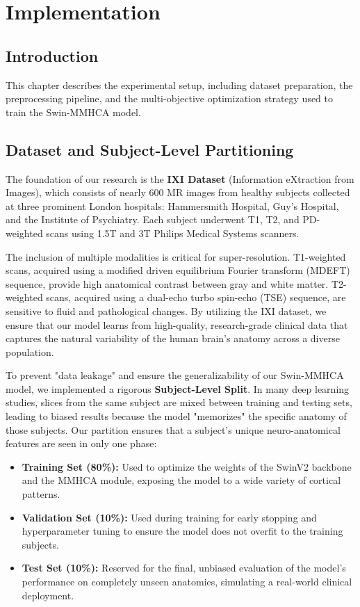 \chapter{Implementation}

\section{Introduction}
This chapter describes the experimental setup, including dataset preparation, the preprocessing pipeline, and the multi-objective optimization strategy used to train the Swin-MMHCA model.

\section{Dataset and Subject-Level Partitioning}
The foundation of our research is the \textbf{IXI Dataset} (Information eXtraction from Images), which consists of nearly 600 MR images from healthy subjects collected at three prominent London hospitals: Hammersmith Hospital, Guy's Hospital, and the Institute of Psychiatry. Each subject underwent T1, T2, and PD-weighted scans using 1.5T and 3T Philips Medical Systems scanners.

The inclusion of multiple modalities is critical for super-resolution. T1-weighted scans, acquired using a modified driven equilibrium Fourier transform (MDEFT) sequence, provide high anatomical contrast between gray and white matter. T2-weighted scans, acquired using a dual-echo turbo spin-echo (TSE) sequence, are sensitive to fluid and pathological changes. By utilizing the IXI dataset, we ensure that our model learns from high-quality, research-grade clinical data that captures the natural variability of the human brain's anatomy across a diverse population.

To prevent "data leakage" and ensure the generalizability of our Swin-MMHCA model, we implemented a rigorous \textbf{Subject-Level Split}. In many deep learning studies, slices from the same subject are mixed between training and testing sets, leading to biased results because the model "memorizes" the specific anatomy of those subjects. Our partition ensures that a subject's unique neuro-anatomical features are seen in only one phase:
\begin{itemize}
    \item \textbf{Training Set (80\%):} Used to optimize the weights of the SwinV2 backbone and the MMHCA module, exposing the model to a wide variety of cortical patterns.
    \item \textbf{Validation Set (10\%):} Used during training for early stopping and hyperparameter tuning to ensure the model does not overfit to the training subjects.
    \item \textbf{Test Set (10\%):} Reserved for the final, unbiased evaluation of the model's performance on completely unseen anatomies, simulating a real-world clinical deployment.
\end{itemize}

